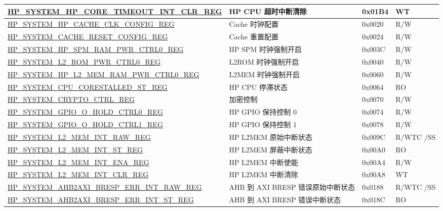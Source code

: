 \begin{longtable}{ | L{8.5cm} | L{6cm} | l | L{1.2cm} | }
\hyperref[regdesc:HPSYSTEMHPCORETIMEOUTINTCLRREG]{HP\_SYSTEM\_HP\_CORE\_TIMEOUT\_INT\_CLR\_REG} & HP CPU 超时中断清除 & 0x01B4 & WT \\ \hline
\hyperref[regdesc:HPSYSTEMHPCACHECLKCONFIGREG]{HP\_SYSTEM\_HP\_CACHE\_CLK\_CONFIG\_REG} & Cache 时钟配置 & 0x0020 & R/W \\ \hline
\hyperref[regdesc:HPSYSTEMCACHERESETCONFIGREG]{HP\_SYSTEM\_CACHE\_RESET\_CONFIG\_REG} & Cache 重置配置 & 0x0024 & R/W \\ \hline
\hyperref[regdesc:HPSYSTEMHPSPMRAMPWRCTRL0REG]{HP\_SYSTEM\_HP\_SPM\_RAM\_PWR\_CTRL0\_REG} & HP SPM 时钟强制开启 & 0x003C & R/W \\ \hline
\hyperref[regdesc:HPSYSTEML2ROMPWRCTRL0REG]{HP\_SYSTEM\_L2\_ROM\_PWR\_CTRL0\_REG} & L2ROM 时钟强制开启 & 0x0040 & R/W \\ \hline
\hyperref[regdesc:HPSYSTEMHPL2MEMRAMPWRCTRL0REG]{HP\_SYSTEM\_HP\_L2\_MEM\_RAM\_PWR\_CTRL0\_REG} & L2MEM 时钟强制开启 & 0x0060 & R/W \\ \hline
\hyperref[regdesc:HPSYSTEMCPUCORESTALLEDSTREG]{HP\_SYSTEM\_CPU\_CORESTALLED\_ST\_REG} & HP CPU 停滞状态 & 0x0064 & RO \\ \hline
\hyperref[regdesc:HPSYSTEMCRYPTOCTRLREG]{HP\_SYSTEM\_CRYPTO\_CTRL\_REG} & 加密控制 & 0x0070 & R/W \\ \hline
\hyperref[regdesc:HPSYSTEMGPIOOHOLDCTRL0REG]{HP\_SYSTEM\_GPIO\_O\_HOLD\_CTRL0\_REG} & HP GPIO 保持控制 0 & 0x0074 & R/W \\ \hline
\hyperref[regdesc:HPSYSTEMGPIOOHOLDCTRL1REG]{HP\_SYSTEM\_GPIO\_O\_HOLD\_CTRL1\_REG} & HP GPIO 保持控制 1 & 0x0078 & R/W \\ \hline
\hyperref[regdesc:HPSYSTEML2MEMINTRAWREG]{HP\_SYSTEM\_L2\_MEM\_INT\_RAW\_REG} & HP L2MEM 原始中断状态 & 0x009C & R/WTC /SS \\ \hline
\hyperref[regdesc:HPSYSTEML2MEMINTSTREG]{HP\_SYSTEM\_L2\_MEM\_INT\_ST\_REG} & HP L2MEM 屏蔽中断状态 & 0x00A0 & RO \\ \hline
\hyperref[regdesc:HPSYSTEML2MEMINTENAREG]{HP\_SYSTEM\_L2\_MEM\_INT\_ENA\_REG} & HP L2MEM 中断使能 & 0x00A4 & R/W \\ \hline
\hyperref[regdesc:HPSYSTEML2MEMINTCLRREG]{HP\_SYSTEM\_L2\_MEM\_INT\_CLR\_REG} & HP L2MEM 中断清除 & 0x00A8 & WT \\ \hline
\hyperref[regdesc:HPSYSTEMAHB2AXIBRESPERRINTRAWREG]{HP\_SYSTEM\_AHB2AXI\_BRESP\_ERR\_INT\_RAW\_REG} & AHB 到 AXI BRESP 错误原始中断状态 & 0x0188 & R/WTC /SS \\ \hline
\hyperref[regdesc:HPSYSTEMAHB2AXIBRESPERRINTSTREG]{HP\_SYSTEM\_AHB2AXI\_BRESP\_ERR\_INT\_ST\_REG} & AHB 到 AXI BRESP 错误中断状态 & 0x018C & RO \\ \hline

\end{longtable}
